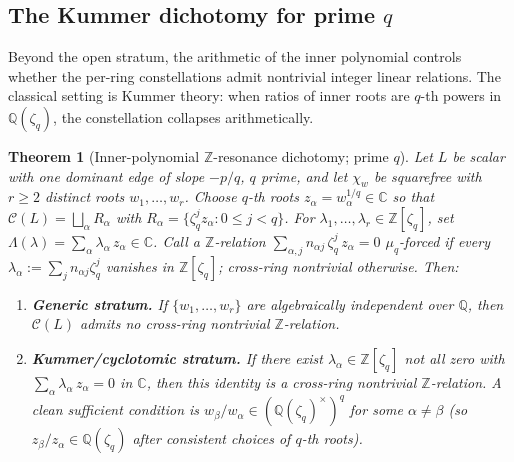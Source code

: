 \documentclass[11pt,a4paper]{article}
\theoremstyle{plain}
\newtheorem{theorem}{Theorem}[section]
\theoremstyle{definition}
\theoremstyle{remark}
\newcommand{\Cl}{\mathcal{C}}
\newcommand{\Zlc}{\mathbb{Z}[\zeta_q]}
\newcommand{\Qlc}{\mathbb{Q}(\zeta_q)}
\begin{document}
\subsection{\texorpdfstring{The Kummer dichotomy for prime $q$}{The Kummer dichotomy for prime q}}\label{ssec:D2}

Beyond the open stratum, the arithmetic of the inner polynomial controls
whether the per-ring constellations admit nontrivial integer linear
relations. The classical setting is Kummer theory: when ratios of inner
roots are $q$-th powers in $\mathbb{Q}(\zeta_q)$, the constellation
collapses arithmetically.

\begin{theorem}[Inner-polynomial $\mathbb{Z}$-resonance dichotomy; prime
$q$]\label{thm:D2}
Let $L$ be scalar with one dominant edge of slope $-p/q$, $q$ \emph{prime},
and let $\chi_w$ be squarefree with $r \ge 2$ distinct roots
$w_1, \dots, w_r$. Choose $q$-th roots $z_\alpha = w_\alpha^{1/q}
\in \mathbb{C}$ so that
$\Cl(L) = \bigsqcup_\alpha R_\alpha$ with
$R_\alpha = \{\zeta_q^j z_\alpha : 0 \le j < q\}$.
For $\lambda_1, \dots, \lambda_r \in \Zlc$, set $\Lambda(\lambda) =
\sum_\alpha \lambda_\alpha\, z_\alpha \in \mathbb{C}$. Call a
$\mathbb{Z}$-relation $\sum_{\alpha, j} n_{\alpha j}\, \zeta_q^j\, z_\alpha
= 0$ \emph{$\mu_q$-forced} if every $\lambda_\alpha := \sum_j n_{\alpha j}
\zeta_q^j$ vanishes in $\Zlc$; \emph{cross-ring nontrivial} otherwise.
Then:
\begin{enumerate}[leftmargin=2em]
\item \textbf{Generic stratum.} If $\{w_1, \dots, w_r\}$ are algebraically
      independent over $\mathbb{Q}$, then $\Cl(L)$ admits \emph{no}
      cross-ring nontrivial $\mathbb{Z}$-relation.
\item \textbf{Kummer/cyclotomic stratum.} If there exist
      $\lambda_\alpha \in \Zlc$ not all zero with $\sum_\alpha
      \lambda_\alpha\, z_\alpha = 0$ in $\mathbb{C}$, then this identity
      \emph{is} a cross-ring nontrivial $\mathbb{Z}$-relation. A clean
      sufficient condition is $w_\beta / w_\alpha \in (\Qlc^\times)^q$ for
      some $\alpha \ne \beta$ (so $z_\beta / z_\alpha \in \Qlc$ after
      consistent choices of $q$-th roots).
\end{enumerate}
\end{theorem}
\end{document}
